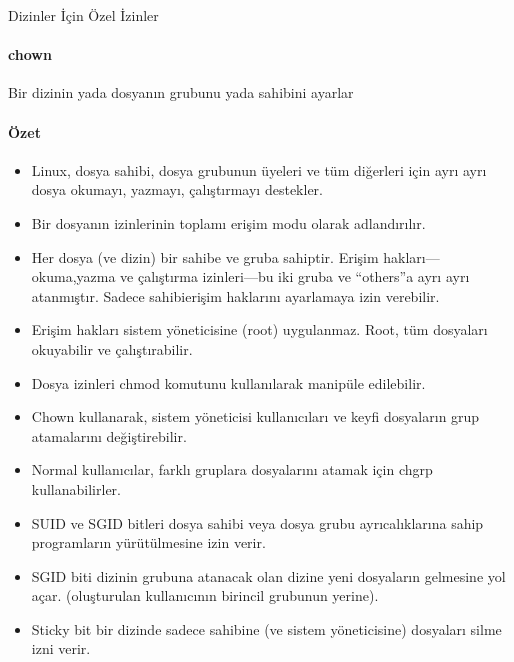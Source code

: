 \begin{section}{Dizinler İçin Özel İzinler}
{\paragraph{chown}{Bir dizinin yada dosyanın grubunu yada sahibini ayarlar}
}

\paragraph{Özet}{
\begin{itemize}
\item Linux, dosya sahibi, dosya grubunun üyeleri ve tüm diğerleri için ayrı ayrı dosya okumayı, yazmayı, çalıştırmayı destekler.
\item Bir dosyanın izinlerinin toplamı erişim modu olarak adlandırılır.
\item Her dosya (ve dizin) bir sahibe ve gruba sahiptir. Erişim hakları—okuma,yazma ve çalıştırma izinleri—bu iki gruba ve “others”a ayrı ayrı atanmıştır. Sadece sahibierişim haklarını ayarlamaya izin verebilir.
\item Erişim hakları sistem yöneticisine (root) uygulanmaz. Root, tüm dosyaları okuyabilir ve çalıştırabilir.
\item Dosya izinleri chmod komutunu kullanılarak manipüle edilebilir.
\item Chown kullanarak, sistem yöneticisi kullanıcıları ve keyfi dosyaların grup atamalarını değiştirebilir.
\item Normal kullanıcılar, farklı gruplara dosyalarını atamak için chgrp kullanabilirler.
\item SUID ve SGID bitleri dosya sahibi veya dosya grubu ayrıcalıklarına sahip programların yürütülmesine izin verir.
\item SGID biti dizinin grubuna atanacak olan dizine yeni dosyaların gelmesine yol açar. (oluşturulan kullanıcının birincil grubunun yerine).
\item Sticky bit bir dizinde sadece sahibine (ve sistem yöneticisine) dosyaları silme izni verir. 
\end{itemize}
}
\end{section}